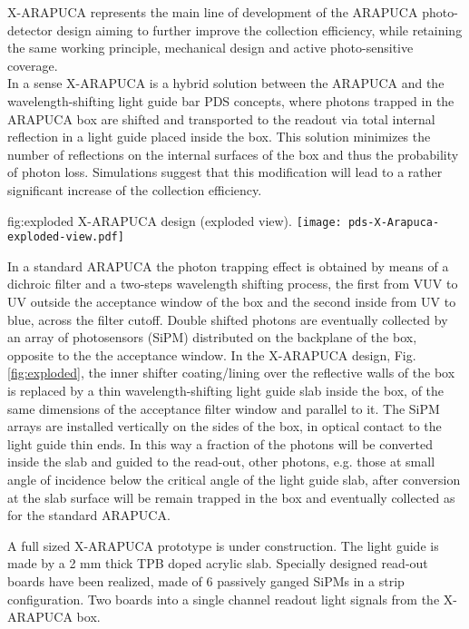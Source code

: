X-ARAPUCA represents the main line of development of the ARAPUCA photo-detector design aiming to further improve the collection efficiency, while retaining the same working
 principle, mechanical design and active  photo-sensitive coverage.\\
In a sense X-ARAPUCA is a hybrid solution between the ARAPUCA and the wavelength-shifting light guide bar PDS concepts, 
where photons trapped in the ARAPUCA box are shifted and transported to the readout via total internal reflection in a light guide placed inside the box.
This solution minimizes the number of reflections on the internal surfaces of the box and thus the probability of photon loss. Simulations suggest that
 this modification will lead to a rather significant increase of the collection efficiency.
 \begin{dunefigure}{fig:exploded}
{X-ARAPUCA design (exploded view).}
   \texttt{[image: pds-X-Arapuca-exploded-view.pdf]}
\end{dunefigure}

 In a standard ARAPUCA the photon trapping effect is obtained by means of a dichroic filter and a two-steps wavelength shifting process, the first from VUV to UV outside the acceptance window of the box and the second inside from UV to blue, across the filter cutoff. Double shifted photons are eventually collected by an array of photosensors (SiPM) distributed on the backplane of the box, opposite to the the acceptance window. In the X-ARAPUCA design, Fig.\ref{fig:exploded}, the inner shifter coating/lining over the reflective walls of the box is replaced by a thin wavelength-shifting light guide slab inside the box, of the same dimensions of the acceptance filter window and parallel to it. The SiPM arrays are installed vertically on the sides of the box, in optical contact to the light guide thin ends. 
 In this way a fraction of the photons will be converted inside the slab and guided to the read-out, other photons,  e.g. those at small angle of incidence below the critical angle of the light guide slab, after conversion at the slab surface will be remain trapped in the box and eventually collected as for the standard ARAPUCA.
 
 A full sized X-ARAPUCA prototype is under construction. The light guide is made by a 2 mm thick TPB doped acrylic slab. Specially designed read-out boards have been realized, made of 6 passively ganged SiPMs in a strip configuration.  Two boards into a single channel readout light signals from the X-ARAPUCA box.  \\
 
